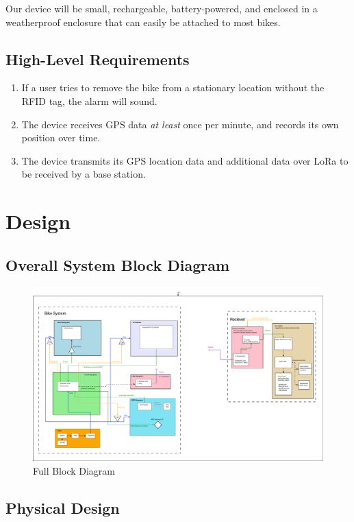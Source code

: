 \documentclass{article}
\begin{document}
Our device will be small, rechargeable, battery-powered, and enclosed in a weatherproof enclosure that can easily be attached to most bikes.
\subsection{High-Level Requirements}

\begin{enumerate}
	\item If a user tries to remove the bike from a stationary location without the RFID tag, the alarm will sound. 
	
	\item The device receives GPS data \textit{at least} once per minute, and records its own position over time.  
	
	\item The device transmits its GPS location data and additional data over LoRa to be received by a base station. 
	
\end{enumerate}

\section{Design}
\subsection{Overall System Block Diagram}
\begin{figure}[H]
	\includegraphics[width=\textwidth]{block_diagram_full.png}
	\caption{Full Block Diagram}
\end{figure}


\subsection{Physical Design}
\end{document}
